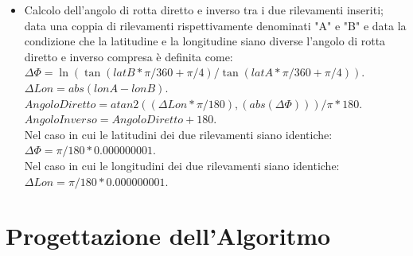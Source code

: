 \documentclass{article}
\begin{document}
\begin{itemize}
	\item Calcolo dell'angolo di rotta diretto e inverso tra i due rilevamenti inseriti; data una coppia di rilevamenti rispettivamente denominati "A" e "B" e data la condizione che la latitudine e la longitudine siano diverse l'angolo di rotta diretto e inverso compresa è definita come: \\
	$\Delta\Phi = \ln( \tan(latB * \pi / 360 + \pi / 4 ) / \tan(latA * \pi / 360 + \pi / 4 )). $\\
	$ \Delta Lon = abs(lonA - lonB). $ \\
	$ Angolo Diretto = atan2((\Delta Lon * \pi / 180), (abs(\Delta\Phi))) / \pi * 180.$\\
	$ Angolo Inverso = Angolo Diretto+ 180.$\\
	Nel caso in cui le latitudini dei due rilevamenti siano identiche:\\
	$\Delta\Phi = \pi / 180 * 0.000000001.$\\
	Nel caso in cui le longitudini dei due rilevamenti siano identiche:\\
	$\Delta Lon = \pi / 180 * 0.000000001.$\\
\end{itemize}
\newpage

\section{Progettazione dell'Algoritmo}
\end{document}
